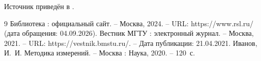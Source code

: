 Источник приведён в \cite{site}.

\begin{thebibliography}{9}
   Библиотека : официальный сайт. – Москва, 2024. –
  URL: https://www.rsl.ru/ (дата обращения: 04.09.2026).
   Вестник МГТУ : электронный журнал. – Москва, 2021. –
  URL: https://vestnik.bmstu.ru/. – Дата публикации: 21.04.2021.
   Иванов, И.~И. Методика измерений. – Москва : Наука, 2020. – 120~с.
\end{thebibliography}

